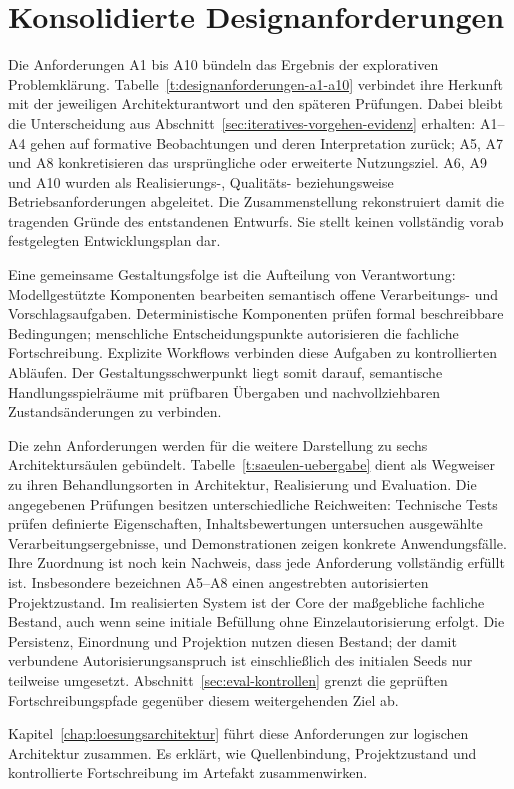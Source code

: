 
\section{Konsolidierte Designanforderungen}
\label{sec:konsolidierte-designanforderungen}

Die Anforderungen A1 bis A10 bündeln das Ergebnis der explorativen
Problemklärung. Tabelle~\ref{t:designanforderungen-a1-a10} verbindet
ihre Herkunft mit der jeweiligen Architekturantwort und den späteren
Prüfungen. Dabei bleibt die Unterscheidung aus
Abschnitt~\ref{sec:iteratives-vorgehen-evidenz} erhalten: A1--A4
gehen auf formative Beobachtungen und deren Interpretation zurück;
A5, A7 und A8 konkretisieren das ursprüngliche oder erweiterte
Nutzungsziel. A6, A9 und A10 wurden als Realisierungs-, Qualitäts-
beziehungsweise Betriebsanforderungen abgeleitet. Die Zusammenstellung
rekonstruiert damit die tragenden Gründe des entstandenen Entwurfs.
Sie stellt keinen vollständig vorab festgelegten Entwicklungsplan dar.




Eine gemeinsame Gestaltungsfolge ist die Aufteilung von
Verantwortung: Modellgestützte Komponenten bearbeiten semantisch
offene Verarbeitungs- und Vorschlagsaufgaben. Deterministische
Komponenten prüfen formal beschreibbare Bedingungen; menschliche
Entscheidungspunkte autorisieren die fachliche Fortschreibung.
Explizite Workflows verbinden diese Aufgaben zu kontrollierten
Abläufen. Der Gestaltungsschwerpunkt liegt somit darauf, semantische
Handlungsspielräume mit prüfbaren Übergaben und nachvollziehbaren
Zustandsänderungen zu verbinden.

Die zehn Anforderungen werden für die weitere Darstellung zu sechs
Architektursäulen gebündelt. Tabelle~\ref{t:saeulen-uebergabe} dient
als Wegweiser zu ihren Behandlungsorten in Architektur, Realisierung
und Evaluation. Die angegebenen Prüfungen besitzen unterschiedliche
Reichweiten: Technische Tests prüfen definierte Eigenschaften,
Inhaltsbewertungen untersuchen ausgewählte Verarbeitungsergebnisse,
und Demonstrationen zeigen konkrete Anwendungsfälle. Ihre Zuordnung
ist noch kein Nachweis, dass jede Anforderung vollständig erfüllt ist.
Insbesondere bezeichnen A5--A8 einen angestrebten autorisierten
Projektzustand. Im realisierten System ist der Core der maßgebliche
fachliche Bestand, auch wenn seine initiale Befüllung ohne
Einzelautorisierung erfolgt. Die Persistenz, Einordnung und Projektion
nutzen diesen Bestand; der damit verbundene Autorisierungsanspruch
ist einschließlich des initialen Seeds nur teilweise umgesetzt.
Abschnitt~\ref{sec:eval-kontrollen} grenzt die geprüften
Fortschreibungspfade gegenüber diesem weitergehenden Ziel ab.



Kapitel~\ref{chap:loesungsarchitektur} führt diese Anforderungen zur
logischen Architektur zusammen. Es erklärt, wie Quellenbindung,
Projektzustand und kontrollierte Fortschreibung im Artefakt
zusammenwirken.

